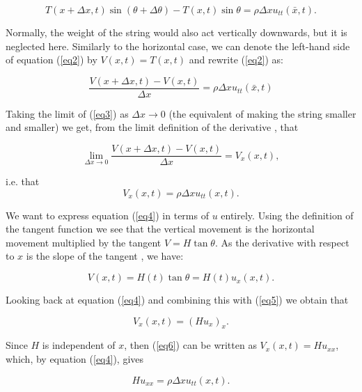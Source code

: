 \documentclass[12pt]{article}
\numberwithin{equation}{section}
\begin{document}
 \begin{equation} \label{eq2}
    T(x+\Delta x,t)\sin{(\theta + \Delta \theta)}-T(x,t)\sin{\theta}=\rho\Delta x u_{tt} (\bar{x},t).
 \end{equation}

 Normally, the weight of the string would also act vertically downwards, but it is neglected here. Similarly to the 
 horizontal case, we can denote the left-hand side of equation (\ref{eq2}) by $V(x,t)=T(x,t)$ and rewrite (\ref{eq2})
 as:

 \begin{equation} \label{eq3}
    \frac{V(x+\Delta x,t)-V(x,t)}{\Delta x}=\rho\Delta x u_{tt} (\bar{x},t)
 \end{equation}

 Taking the limit of (\ref{eq3}) as $\Delta x \rightarrow 0$ (the equivalent of making the string smaller and smaller)
 we get, from the limit definition of the derivative \cite{Spi}, that 

 \begin{equation*}
    \lim_{\Delta x \rightarrow 0}\frac{V(x+\Delta x,t)-V(x,t)}{\Delta x}=V_x(x,t),
 \end{equation*}

i.e. that 
\begin {equation} \label{eq4}
    V_x(x,t)=\rho\Delta x u_{tt} (x,t).
\end{equation}

We want to express equation (\ref{eq4}) in terms of $u$ entirely. Using the definition of the tangent function we see that the vertical movement is the
horizontal movement multiplied by the tangent $V=H\tan{\theta}$. As the derivative with respect to $x$ is the slope of
the tangent \cite{Spi}, we have:

\begin{equation} \label{eq5}
    V(x,t)=H(t)\tan{\theta}=H(t)u_x(x,t).
\end{equation}

Looking back at equation (\ref{eq4}) and combining this with (\ref{eq5}) we obtain that

\begin{equation} \label{eq6}
    V_x(x,t)=(Hu_x)_x.
\end{equation}

Since $H$ is independent of $x$, then (\ref{eq6}) can be written as $V_x(x,t)=Hu_{xx}$, which, by equation (\ref{eq4}), 
gives

\begin {equation} \label{eq7}
    Hu_{xx}=\rho\Delta x u_{tt} (x,t).
\end{equation}
\end{document}
